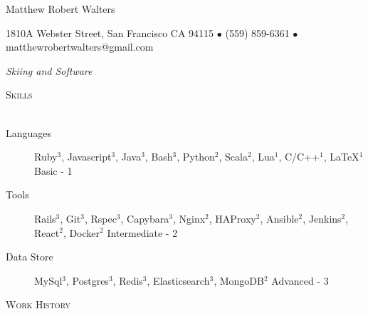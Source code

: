 \documentclass{article}
\newcommand{\lineunder}{\vspace*{-8pt} \\ \hspace*{-18pt} \hrulefill \\}
\newcommand{\header}[1]{{\hspace*{-15pt}\vspace*{6pt} \textsc{#1}} \vspace*{-6pt} \lineunder}
\begin{document}
\small
\smallskip
\vspace*{-44pt}


\begin{center}
 
\huge Matthew Robert Walters 
\linebreak
\normalsize

{1810A Webster Street, San Francisco CA 94115 $\bullet$ (559) 859-6361 $\bullet$ matthewrobertwalters@gmail.com} \newline


 \textit{Skiing and Software}
\end{center}

\small

\header{Skills}

\begin{description}

\item[Languages] Ruby$^3$, Javascript$^3$, Java$^3$, Bash$^3$, Python$^2$, Scala$^2$, Lua$^1$, C/C++$^1$, \LaTeX$^1$             \hfill Basic - 1

\item[Tools] Rails$^3$, Git$^3$, Rspec$^3$, Capybara$^3$, Nginx$^2$, HAProxy$^2$, Ansible$^2$, Jenkins$^2$, React$^2$, Docker$^2$     \hfill Intermediate - 2	
			                                            
\item[Data Store] MySql$^3$, Postgres$^3$, Redis$^3$, Elasticsearch$^3$, MongoDB$^2$                                                       \hfill Advanced - 3

\end{description}

\header{Work History}
\end{document}

